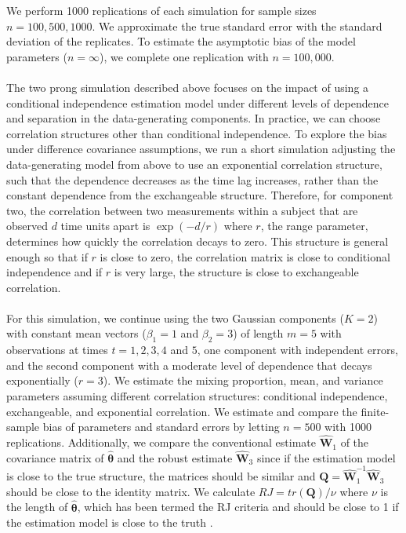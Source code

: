 \documentclass[10pt]{article}
\newcommand{\B}[0]{\mathbf}
\newcommand{\bs}[0]{\boldsymbol}
\begin{document}
We perform 1000 replications of each simulation for sample sizes $n=100, 500, 1000$. We approximate the true standard error with the standard deviation of the replicates. To estimate the asymptotic bias of the model parameters ($n=\infty$), we complete one replication with $n=100,000$.\\\\
The two prong simulation described above focuses on the impact of using a conditional independence estimation model under different levels of dependence and separation in the data-generating components. In practice, we can choose correlation structures other than conditional independence. To explore the bias under difference covariance assumptions, we run a short simulation adjusting the data-generating model from above to use an exponential correlation structure, such that the dependence decreases as the time lag increases, rather than the constant dependence from the exchangeable structure. Therefore, for component two, the correlation between two measurements within a subject that are observed $d$ time units apart is $\exp(-d/r)$ where $r$, the range parameter, determines how quickly the correlation decays to zero. This structure is general enough so that if $r$ is close to zero, the correlation matrix is close to conditional independence and if $r$ is very large, the structure is close to exchangeable correlation. \\\\
For this simulation, we continue using the two Gaussian components ($K = 2$) with constant mean vectors ($\beta_{1}=1$ and $\beta_{2}=3$) of length $m=5$ with observations at times $t=1,2,3,4$ and $5$, one component with independent errors, and the second component with a moderate level of dependence that decays exponentially ($r=3$). We estimate the mixing proportion, mean, and variance parameters assuming different correlation structures: conditional independence, exchangeable, and exponential correlation. We estimate and compare the finite-sample bias of parameters and standard errors by letting $n=500$ with 1000 replications. Additionally, we compare the conventional estimate $\widehat{\B W}_{1}$ of the covariance matrix of $\widehat{\bs \theta}$ and the robust estimate $\widehat{\B W}_{3}$ since if the estimation model is close to the true structure, the matrices should be similar and $\B Q = \widehat{\B W}_{1}^{-1}\widehat{\B W}_{3}$ should be close to the identity matrix. We calculate $RJ=tr(\B Q)/\nu$ where $\nu$ is the length of $\widehat{\bs\theta}$, which has been termed the RJ criteria and should be close to 1 if the estimation model is close to the truth \cite{shults2009,rotnitzky1990}.
\end{document}
